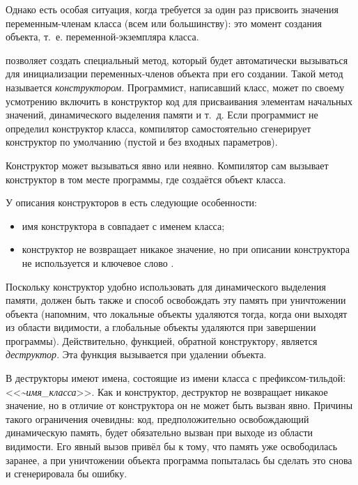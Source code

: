 Однако есть особая ситуация, когда требуется за один раз присвоить значения переменным-членам класса (всем или
большинству):  это момент создания объекта, т.~е. переменной-экземпляра класса. 

 позволяет создать специальный метод, который будет автоматически вызываться для инициализации переменных-членов
объекта при его создании. Такой метод называется
\emph{конструктором}. Программист,
написавший класс, может по своему усмотрению включить в конструктор код для присваивания элементам начальных значений,
динамического выделения памяти и т.~д. Если программист не определил конструктор класса, компилятор самостоятельно
сгенерирует конструктор по умолчанию (пустой и без входных параметров). 

Конструктор может вызываться явно или неявно. Компилятор сам вызывает конструктор в том месте программы, где создаётся
объект класса. 

У описания конструкторов в  есть следующие особенности:

\begin{itemize}
\item имя конструктора в  совпадает с именем класса;
\item конструктор не возвращает никакое значение, но при описании конструктора не используется и ключевое слово
.
\end{itemize}
Поскольку конструктор удобно использовать для динамического выделения памяти, должен быть также и способ освобождать эту
память при уничтожении объекта (напомним, что локальные объекты удаляются тогда, когда они выходят из области
видимости, а глобальные объекты удаляются при завершении программы). Действительно, функцией, обратной конструктору,
является \emph{деструктор}. Эта функция вызывается при удалении объекта. 

В  деструкторы имеют имена, состоящие из имени класса с префиксом-тильдой: 
<<\emph{\~{}имя\_класса}>>. Как и конструктор, деструктор не возвращает никакое значение, но в
отличие от конструктора он не может быть вызван явно. Причины такого ограничения очевидны: код, предположительно
освобождающий динамическую память, будет обязательно вызван при выходе из области видимости. Его явный вызов привёл бы
к тому, что память уже освободилась заранее, а при уничтожении объекта программа попыталась бы сделать это снова и
сгенерировала бы ошибку.

